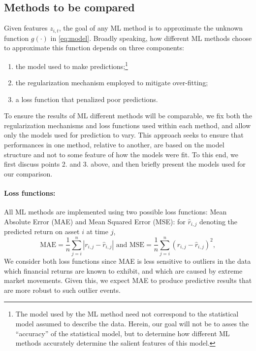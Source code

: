 \documentclass{article}
\begin{document}
\subsection{Methods to be compared}Given features $z_{i,t}$, the goal of any ML method is to approximate the unknown function $g(\cdot)$ in \ref{eq:model}.  Broadly speaking, how different ML methods choose to approximate this function depends on three components:
\begin{enumerate}
	\item the model used to make predictions;\footnote{The model used by the ML method need not correspond to the statistical model assumed to describe the data. Herein, our goal will not be to asses the ``accuracy'' of the statistical model, but to determine how different ML methods accurately determine the salient features of this model. }
	\item the regularization mechanism employed to mitigate over-fitting; 
	\item a loss function that penalized poor predictions. 
\end{enumerate}


To ensure the results of ML different methods will be comparable, we fix both the regularization mechanisms and loss functions used within each method, and allow only the models used for prediction to vary. This approach seeks to ensure that performances in one method, relative to another, are based on the model structure and not to some feature of how the models were fit. To this end, we first discuss points 2. and 3. above, and then briefly present the models used for our comparison. 
\paragraph{Loss functions:}All ML methods are implemented using two possible loss functions: Mean Absolute Error (MAE) and Mean Squared Error (MSE): for $\widehat{r}_{i,j}$ denoting the predicted return on asset $i$ at time $j$,
\begin{equation*}
\text{MAE} = \frac{1}{n} \sum_{j = i}^{n} |r_{i,j} - \widehat{r}_{i,j}|\text{ and }
\text{MSE} = \frac{1}{n} \sum_{j = i}^{n} \left( r_{i,j} - \widehat{r}_{i,j}\right) ^2,
\end{equation*}We consider both loss functions since MAE is less sensitive to outliers in the data which financial returns are known to exhibit, and which are caused by extreme market movements. Given this, we expect MAE to  produce predictive results that are more robust to such outlier events. 
\end{document}
